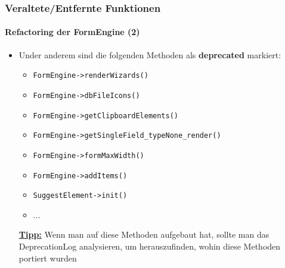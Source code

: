 
\begin{frame}[fragile]
	\frametitle{Veraltete/Entfernte Funktionen}
	\framesubtitle{Refactoring der FormEngine (2)}

	\begin{itemize}

		\item Under anderem sind die folgenden Methoden als \textbf{deprecated} markiert:

			\begin{itemize}
				\item \texttt{FormEngine->renderWizards()}
				\item \texttt{FormEngine->dbFileIcons()}
				\item \texttt{FormEngine->getClipboardElements()}
				\item \texttt{FormEngine->getSingleField\_typeNone\_render()}
				\item \texttt{FormEngine->formMaxWidth()}
				\item \texttt{FormEngine->addItems()}
				\item \texttt{SuggestElement->init()}
				\item ...
			\end{itemize}

		\small
			\underline{\textbf{Tipp:}}
			Wenn man auf diese Methoden aufgebaut hat, sollte man das DeprecationLog
			analysieren, um herauszufinden, wohin diese Methoden portiert wurden
		\normalsize

	\end{itemize}

\end{frame}


